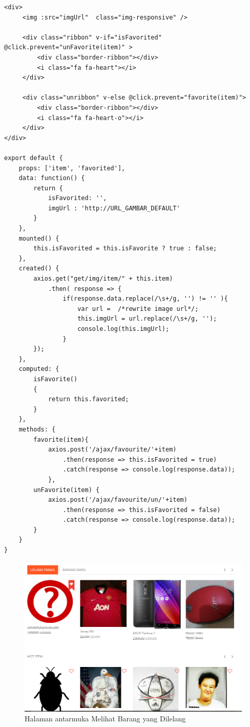 \begin{lstlisting}[label=cdv.02-01,style=htmlcssjs,caption=Kode Sumber Vue Melihat Daftar Barang]
<div>
	 <img :src="imgUrl"  class="img-responsive" />
	 
	 <div class="ribbon" v-if="isFavorited" @click.prevent="unFavorite(item)" >
		 <div class="border-ribbon"></div>
		 <i class="fa fa-heart"></i>
	 </div>
	 
	 <div class="unribbon" v-else @click.prevent="favorite(item)">
		 <div class="border-ribbon"></div>
		 <i class="fa fa-heart-o"></i>
	 </div>
</div>

export default {
    props: ['item', 'favorited'],
    data: function() {
        return {
            isFavorited: '',
            imgUrl : 'http://URL_GAMBAR_DEFAULT'
        }
    },
    mounted() {
        this.isFavorited = this.isFavorite ? true : false;
    },
    created() {
        axios.get("get/img/item/" + this.item)
            .then( response => {
	            if(response.data.replace(/\s+/g, '') != '' ){
	            	var url =  /*rewrite image url*/;
	            	this.imgUrl = url.replace(/\s+/g, '');
	            	console.log(this.imgUrl);
	        	}
    	});
    },
    computed: {
        isFavorite()
        {
            return this.favorited;
        }
    },
    methods: {
        favorite(item){
            axios.post('/ajax/favourite/'+item)
                .then(response => this.isFavorited = true)
        		.catch(response => console.log(response.data));
        	},
        unFavorite(item) {
            axios.post('/ajax/favourite/un/'+item)
                .then(response => this.isFavorited = false)
        		.catch(response => console.log(response.data));
        }
    }
}
\end{lstlisting}

\begin{figure}[H]
	\centering
	\includegraphics[width=\textwidth]{images/bab4/ui/02-01.png}
	\caption{Halaman antarmuka Melihat Barang yang Dilelang }
	\label{ui.02-01}
\end{figure}


